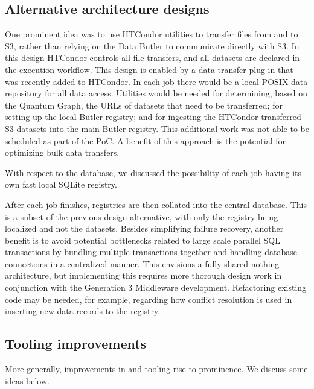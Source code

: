 \subsection{Alternative architecture designs}


One prominent idea was to use HTCondor utilities to transfer files from and to S3, rather than relying on the Data Butler to communicate directly with S3.
In this design HTCondor controls all file transfers, and all datasets are declared in the execution workflow.
This design is enabled by a data transfer plug-in that was recently added to HTCondor.
In each job there would be a local POSIX data repository for all data access.
Utilities would be needed for determining, based on the Quantum Graph, the URLs of datasets that need to be transferred; for setting up the local Butler registry; and for ingesting the HTCondor-transferred S3 datasets into the main Butler registry.
This additional work was not able to be scheduled as part of the PoC.
A benefit of this approach is the potential for optimizing bulk data transfers.

With respect to the database, we discussed the possibility of each job having its own fast local SQLite registry.

After each job finishes, registries are then collated into the central database.
This is a subset of the previous design alternative, with only the registry being localized and not the datasets.
Besides simplifying failure recovery, another benefit is to avoid potential bottlenecks related to large scale parallel SQL transactions by bundling multiple transactions together and handling database connections in a centralized manner.
This envisions a fully shared-nothing architecture, but implementing this requires more thorough design work in conjunction with the Generation 3 Middleware development.
Refactoring existing code may be needed, for example, regarding how conflict resolution is used in inserting new data records to the registry.


\subsection{Tooling improvements}

More generally, improvements in and tooling rise to prominence.
We discuss some ideas below.

